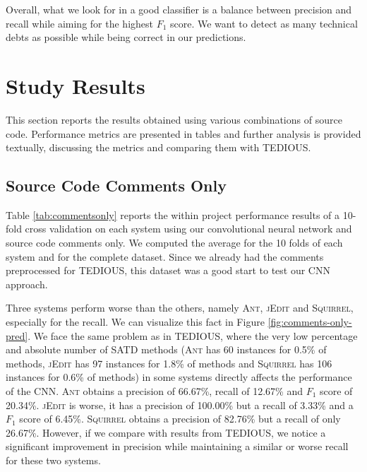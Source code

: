 
Overall, what we look for in a good classifier is a balance between precision and recall while aiming for the highest $F_1$ score. We want to detect as many technical debts as possible while being correct in our predictions.

\section{Study Results}

This section reports the results obtained using various combinations of source code. Performance metrics are presented in tables and further analysis is provided textually, discussing the metrics and comparing them with TEDIOUS.


\subsection{Source Code Comments Only}


Table \ref{tab:commentsonly} reports the within project performance results of a 10-fold cross validation on each system using our convolutional neural network and source code comments only. We computed the average for the 10 folds of each system and for the complete dataset. Since we already had the comments preprocessed for TEDIOUS, this dataset was a good start to test our CNN approach.

Three systems perform worse than the others, namely \textsc{Ant}, \textsc{jEdit} and \textsc{Squirrel}, especially for the recall. We can visualize this fact in Figure \ref{fig:comments-only-pred}. We face the same problem as in TEDIOUS, where the very low percentage and absolute number of SATD methods (\textsc{Ant} has 60 instances for 0.5\% of methods, \textsc{jEdit} has 97 instances for 1.8\% of methods and \textsc{Squirrel} has 106 instances for 0.6\% of methods) in some systems directly affects the performance of the CNN. \textsc{Ant} obtains a precision of 66.67\%, recall of 12.67\% and $F_1$ score of 20.34\%. \textsc{jEdit} is worse, it has a precision of 100.00\% but a recall of 3.33\% and a $F_1$ score of 6.45\%. \textsc{Squirrel} obtains a precision of 82.76\% but a recall of only 26.67\%. However, if we compare with results from TEDIOUS, we notice a significant improvement in precision while maintaining a similar or worse recall for these two systems.

